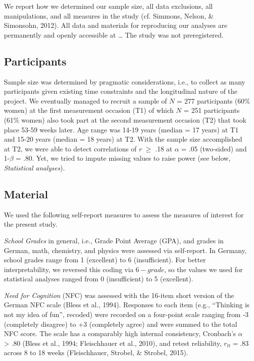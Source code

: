 \documentclass[
  man]{apa6}
\begin{document}
We report how we determined our sample size, all data exclusions, all manipulations, and all measures in the study (cf. Simmons, Nelson, \& Simonsohn, 2012). All data and materials for reproducing our analyses are permanently and openly accessible at \ldots{} The study was not preregistered.

\hypertarget{participants}{%
\subsection{Participants}\label{participants}}

Sample size was determined by pragmatic considerations, i.e., to collect as many participants given existing time constraints and the longitudinal nature of the project. We eventually managed to recruit a sample of \(N\) = 277 participants (60\% women) at the first measurement occasion (T1) of which \(N\) = 251 participants (61\% women) also took part at the second measurement occasion (T2) that took place 53-59 weeks later. Age range was 14-19 years (median = 17 years) at T1 and 15-20 years (median = 18 years) at T2. With the sample size accomplished at T2, we were able to detect correlations of \emph{r} \(\ge\) .18 at \(\alpha\) = .05 (two-sided) and 1-\(\beta\) = .80. Yet, we tried to impute missing values to raise power (see below, \emph{Statistical analyses}).

\hypertarget{material}{%
\subsection{Material}\label{material}}

We used the following self-report measures to assess the measures of interest for the present study.

\emph{School Grades} in general, i.e., Grade Point Average (GPA), and grades in German, math, chemistry, and physics were assessed via self-report. In Germany, school grades range from 1 (excellent) to 6 (insufficient). For better interpretability, we reversed this coding via \(6 - grade\), so the values we used for statistical analyses ranged from 0 (insufficient) to 5 (excellent).

\emph{Need for Cognition} (NFC) was assessed with the 16-item short version of the German NFC scale (Bless et al., 1994). Responses to each item (e.g., ``Thinking is not my idea of fun'', recoded) were recorded on a four-point scale ranging from -3 (completely disagree) to +3 (completely agree) and were summed to the total NFC score. The scale has a comparably high internal consistency, Cronbach's \(\alpha\) \textgreater{} .80 (Bless et al., 1994; Fleischhauer et al., 2010), and retest reliability, \(r_{tt} = .83\) across 8 to 18 weeks (Fleischhauer, Strobel, \& Strobel, 2015).
\end{document}
